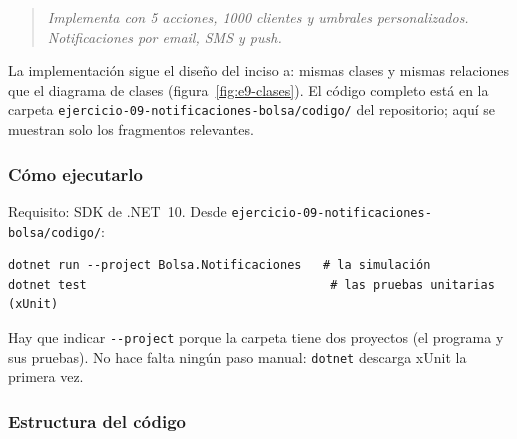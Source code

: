 
\begin{quote}
\itshape
Implementa con 5 acciones, 1000 clientes y umbrales personalizados. Notificaciones por
email, SMS y push.
\end{quote}

La implementación sigue el diseño del inciso a: mismas clases y mismas relaciones que el
diagrama de clases (figura~\ref{fig:e9-clases}). El código completo está en la carpeta
\texttt{ejercicio-09-notificaciones-bolsa/codigo/} del repositorio; aquí se muestran solo
los fragmentos relevantes.

\subsubsection{Cómo ejecutarlo}

Requisito: SDK de .NET~10. Desde \texttt{ejercicio-09-notificaciones-bolsa/codigo/}:

\begin{lstlisting}[language={}, numbers=none, basicstyle=\ttfamily\footnotesize, columns=fullflexible, keepspaces=true]
dotnet run --project Bolsa.Notificaciones   # la simulación
dotnet test                                  # las pruebas unitarias (xUnit)
\end{lstlisting}

Hay que indicar \texttt{-{}-project} porque la carpeta tiene dos proyectos (el programa y
sus pruebas). No hace falta ningún paso manual: \texttt{dotnet} descarga xUnit la primera vez.

\subsubsection{Estructura del código}

